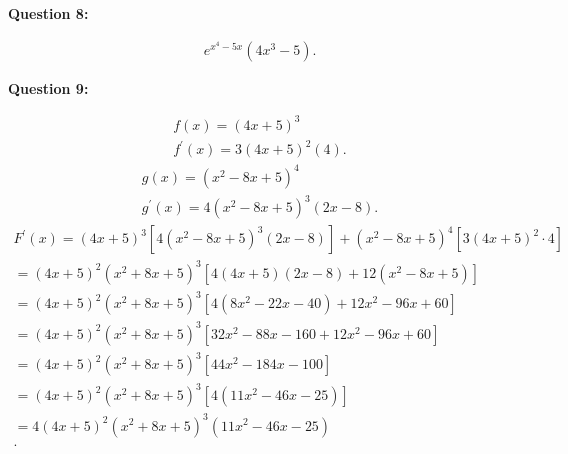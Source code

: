 \documentclass{report}
\begin{document}
    \bigbreak \noindent \bigbreak \noindent 
    \begin{Large}
        \textbf{Question 8:}
    \end{Large}
    \bigbreak \noindent 
    \bigbreak \noindent 
    \begin{align*}
        e^{x^{4}-5x}(4x^{3}-5)
    .\end{align*}

    \bigbreak \noindent \bigbreak \noindent 
    \begin{Large}
        \textbf{Question 9:}
    \end{Large}
    \bigbreak \noindent 
    \bigbreak \noindent 
    \begin{align*}
        f(x) = (4x+5)^{3} \\
        f^{\prime}(x) = 3(4x+5)^{2}(4)
    .\end{align*}
    \begin{align*}
        g(x) = (x^{2}-8x+5)^{4} \\
        g^{\prime}(x) = 4(x^{2}-8x+5)^{3}(2x-8)
    .\end{align*}
    \begin{align*}
        F^{\prime}(x) = (4x+5)^{3}[4(x^{2}-8x+5)^{3}(2x-8)]+(x^{2}-8x+5)^{4}[3(4x+5)^{2}\cdot 4] \\
        = (4x+5)^{2}(x^{2}+8x+5)^{3}[4(4x+5)(2x-8)+12(x^{2}-8x+5)]\\
        = (4x+5)^{2}(x^{2}+8x+5)^{3}[4(8x^2-22x-40)+12x^{2}-96x+60]\\
        = (4x+5)^{2}(x^{2}+8x+5)^{3}[32x^2-88x-160+12x^{2}-96x+60]\\
        = (4x+5)^{2}(x^{2}+8x+5)^{3}[44x^{2}-184x-100]\\
        = (4x+5)^{2}(x^{2}+8x+5)^{3}[4(11x^{2}-46x-25)]\\
        = 4(4x+5)^{2}(x^{2}+8x+5)^{3}(11x^{2}-46x-25)\\
    .\end{align*}
\end{document}
